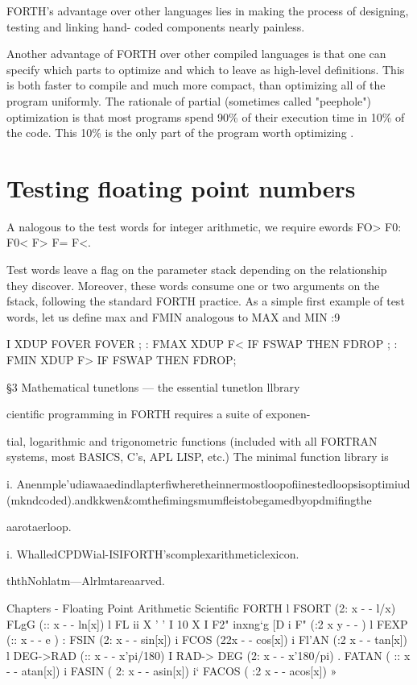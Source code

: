 FORTH’s advantage over other languages lies in making the 
process of designing, testing and linking hand- coded components
nearly painless.

Another advantage of FORTH over other compiled languages is
that one can specify which parts to optimize and which to leave
as high-level definitions. This is both faster to compile and much
more compact, than optimizing all of the program uniformly. The
rationale of partial (sometimes called "peephole") optimization
is that most programs spend 90\% of their execution time in 10\%
of the code. This 10\% is the only part of the program worth
optimizing .

\section{Testing floating point numbers}

A nalogous to the test words for integer arithmetic, we require
ewords FO> F0: F0< F> F= F<.

Test words leave a ﬂag on the parameter stack depending on the
relationship they discover. Moreover, these words consume one
or two arguments on the fstack, following the standard FORTH
practice. As a simple first example of test words, let us define
max and FMIN analogous to MAX and MIN :9

I XDUP FOVER FOVER ;
: FMAX XDUP F< IF FSWAP THEN FDROP ;
: FMIN XDUP F> IF FSWAP THEN FDROP;

§3 Mathematical tunetlons — the essential tunetlon llbrary

cientific programming in FORTH requires a suite of exponen-

tial, logarithmic and trigonometric functions (included with all
FORTRAN systems, most BASICS, C’s, APL LISP, etc.) The
minimal function library is

 

i. Anenmple'udiawaaedindlapterfiwheretheinnermostloopofiinestedloopsisoptimiud
(mkndcoded).andkkwen&omthefimingsmumﬂeistobegamedbyopdmifingthe

aarotaerloop.

i. WhalledCPDWial-ISIFORTH'scomplexarithmeticlexicon.

ththNohlatm—Alrlmtareaarved.

 

Chapters - Floating Point Arithmetic Scientific FORTH
l
FSORT (2: x - - l/x)
FLgG (:: x - - ln[x]) l
FL ii X ' ' I 10 X I
F2" inxng‘g [D i
F" (:2 x y - - ) l
FEXP (:: x - - e ) :
FSIN (2: x - - sin[x]) i
FCOS (22x - - cos[x]) i
Fl'AN (:2 x - - tan[x]) l
DEG->RAD (:: x - - x’pi/180) I
RAD-> DEG (2: x - - x'180/pi) .
FATAN ( :: x - - atan[x]) i
FASIN ( 2: x - - asin[x]) i‘
FACOS ( :2 x - - acos[x]) »


